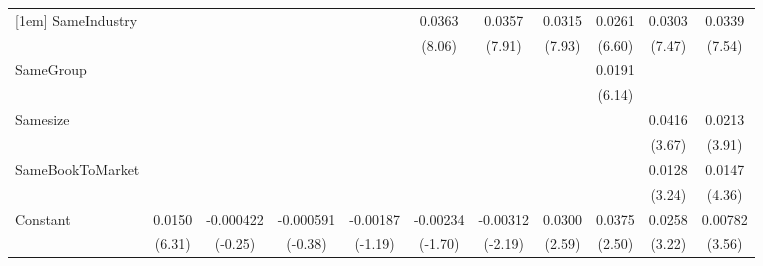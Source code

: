 {\begin{tabular}{l*{10}{c}}
[1em]
SameIndustry        &                     &                     &                     &                     &      0.0363\sym{***}&      0.0357\sym{***}&      0.0315\sym{***}&      0.0261\sym{***}&      0.0303\sym{***}&      0.0339\sym{***}\\
                    &                     &                     &                     &                     &      (8.06)         &      (7.91)         &      (7.93)         &      (6.60)         &      (7.47)         &      (7.54)         \\
[1em]
SameGroup           &                     &                     &                     &                     &                     &                     &                     &      0.0191\sym{***}&                     &                     \\
                    &                     &                     &                     &                     &                     &                     &                     &      (6.14)         &                     &                     \\
[1em]
Samesize            &                     &                     &                     &                     &                     &                     &                     &                     &      0.0416\sym{***}&      0.0213\sym{***}\\
                    &                     &                     &                     &                     &                     &                     &                     &                     &      (3.67)         &      (3.91)         \\
[1em]
SameBookToMarket    &                     &                     &                     &                     &                     &                     &                     &                     &      0.0128\sym{**} &      0.0147\sym{***}\\
                    &                     &                     &                     &                     &                     &                     &                     &                     &      (3.24)         &      (4.36)         \\
[1em]
Constant            &      0.0150\sym{***}&   -0.000422         &   -0.000591         &    -0.00187         &    -0.00234         &    -0.00312\sym{*}  &      0.0300\sym{*}  &      0.0375\sym{*}  &      0.0258\sym{**} &     0.00782\sym{***}\\
                    &      (6.31)         &     (-0.25)         &     (-0.38)         &     (-1.19)         &     (-1.70)         &     (-2.19)         &      (2.59)         &      (2.50)         &      (3.22)         &      (3.56)         \\

\end{tabular}}
